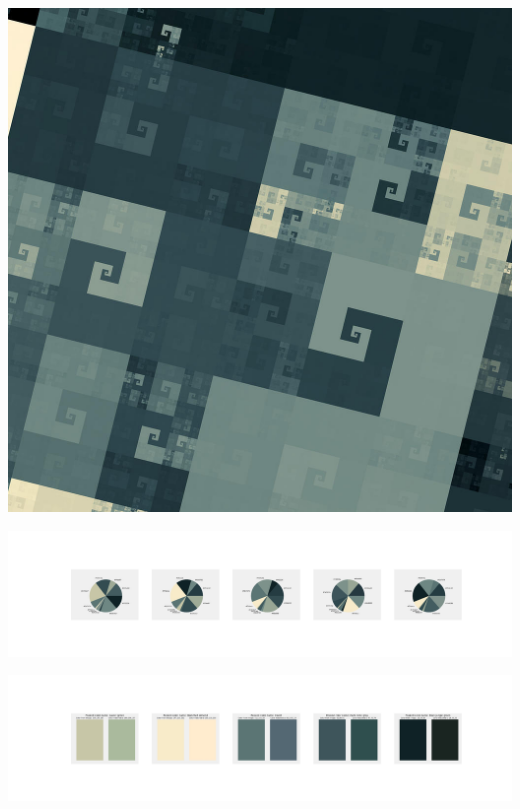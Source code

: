 \documentclass[11pt]{article}
\begin{document}
\begin{landscape}
    \begin{center}
    \includegraphics[width=\textwidth]{./nbimg/file (355).jpg}
    \end{center}

    \begin{center}
    \includegraphics[width=250mm]{./nbimg/pie-284.jpg}
    \end{center}

    \begin{center}
    \includegraphics[width=250mm]{./nbimg/peak-284.jpg}
    \end{center}
    


\end{landscape}
\end{document}
